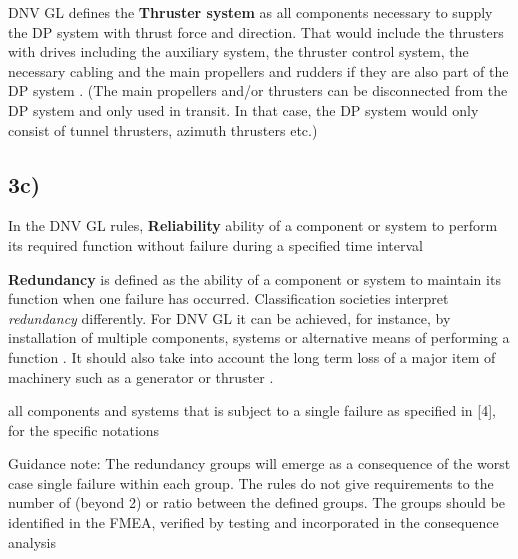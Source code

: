 DNV GL defines the \textbf{Thruster system} as all components necessary to supply the DP system with thrust force and direction. That would include the thrusters with drives including the auxiliary system, the thruster control system, the necessary cabling and the main propellers and rudders if they are also part of the DP system \cite{RulesShipsDNVGLPart6Chap3}. (The main propellers and/or thrusters can be disconnected from the DP system and only used in transit. In that case, the DP system would only consist of tunnel thrusters, azimuth thrusters etc.)




\subsection*{3c)}

In the DNV GL rules, \textbf{Reliability} ability of a component or system to perform its required function without failure during a specified time interval

\textbf{Redundancy} is defined as the ability of a component or system to maintain its function when one failure has occurred.
Classification societies interpret \textit{redundancy} differently. For DNV GL it can be achieved, for instance, by installation of multiple components, systems or alternative means of performing a function \cite{RulesShipsDNVGLPart6Chap3}. It should also take into account the long term loss of a major item of machinery such as a generator or thruster \cite{RecommendedPractices_DP_DNVGL}. 



all components and systems that is subject to a single failure as specified in [4], for the specific notations

Guidance note:
The redundancy groups will emerge as a consequence of the worst case single failure within each
group. The rules do not give requirements to the number of (beyond 2) or ratio between the
defined groups. The groups should be identified in the FMEA, verified by testing and incorporated in
the consequence analysis

    \begin{comment}
    \cite{RecommendedPractices_DP_DNVGL} page 26.
    
    There are three key elements in any redundancy concept:
    1) performance
    2) protection
    3) detection
    
    THEN THEY EXPLAIN EACH. SEE IF WE NEED TO INCLUDE THIS
    \end{comment}

